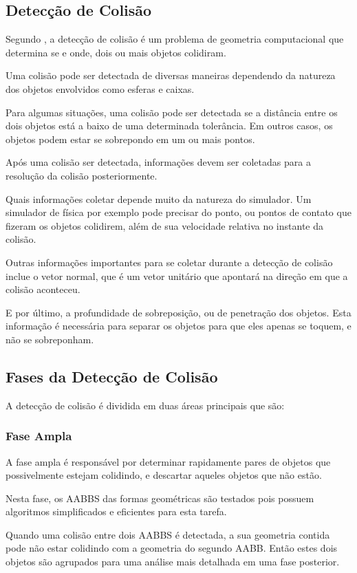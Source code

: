 \subsection{Detecção de Colisão}
Segundo , a detecção de colisão é um problema de geometria computacional que
determina se e onde, dois ou mais objetos colidiram.

Uma colisão pode ser detectada de diversas maneiras dependendo da natureza dos
objetos envolvidos como esferas e caixas.

Para algumas situações, uma colisão
pode ser detectada se a distância entre os dois objetos está a baixo de uma
determinada tolerância. Em outros casos, os objetos podem estar se sobrepondo
em um ou mais pontos.

Após uma colisão ser detectada, informações devem ser coletadas para a
resolução da colisão posteriormente.

Quais informações coletar depende muito da natureza do simulador. Um simulador
de física por exemplo pode precisar do ponto, ou pontos de contato que fizeram
os objetos colidirem, além de sua velocidade relativa no instante da colisão.


Outras informações importantes para se coletar durante a detecção de colisão
inclue o vetor normal, que é um vetor unitário que apontará na direção em que a
colisão aconteceu.


E por último, a profundidade de sobreposição, ou de penetração dos objetos.
Esta informação é necessária para separar os objetos para que eles apenas se
toquem, e não se sobreponham.


\subsection{Fases da Detecção de Colisão}

A detecção de colisão é dividida em duas áreas principais que são:

\subsubsection{Fase Ampla}
A fase ampla é responsável por determinar rapidamente pares de objetos que
possivelmente estejam colidindo, e descartar aqueles objetos que não estão.

Nesta fase, os AABBS das formas geométricas são testados pois possuem
algoritmos simplificados e eficientes para esta tarefa.

Quando uma colisão entre dois AABBS é detectada, a sua geometria contida pode
não estar colidindo com a geometria do segundo AABB. Então estes dois objetos
são agrupados para uma análise mais detalhada em uma fase posterior.

